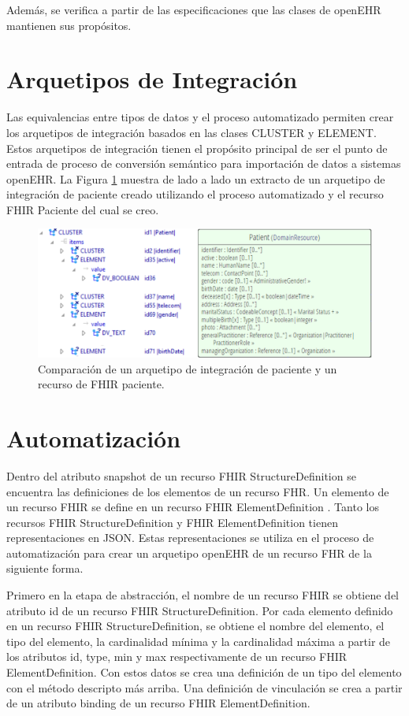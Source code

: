 Además, se verifica a partir de las especificaciones que las clases de openEHR mantienen sus propósitos.

\section{Arquetipos de Integración}

Las equivalencias entre tipos de datos y el proceso automatizado permiten crear los arquetipos de integración basados en las clases CLUSTER y ELEMENT. Estos arquetipos de integración tienen el propósito principal de ser el punto de entrada de proceso de conversión semántico para importación de datos a sistemas openEHR. La Figura \ref{fig:comparison} muestra de lado a lado un extracto de un arquetipo de integración de paciente creado utilizando el proceso automatizado y el recurso FHIR Paciente del cual se creo.

\begin{figure}
  \centering
  \includegraphics[scale=0.8]{./images/comparison_patient.png}
  \caption{Comparación de un arquetipo de integración de paciente y un recurso de FHIR paciente.}
  \label{fig:comparison}
\end{figure}

\section{Automatización}

Dentro del atributo snapshot de un recurso FHIR StructureDefinition se encuentra las definiciones de los elementos de un recurso FHR. Un elemento de un recurso FHIR se define en un recurso FHIR ElementDefinition \cite{FHIRElementDefinition}. Tanto los recursos FHIR StructureDefinition y FHIR ElementDefinition tienen representaciones en JSON. Estas representaciones se utiliza en el proceso de automatización para crear un arquetipo openEHR de un recurso FHR de la siguiente forma.

Primero en la etapa de abstracción, el nombre de un recurso FHIR se obtiene del atributo id de un recurso FHIR StructureDefinition. Por cada elemento definido en un recurso FHIR StructureDefinition, se obtiene el nombre del elemento, el tipo del elemento, la cardinalidad mínima y la cardinalidad máxima a partir de los atributos id, type, min y max respectivamente de un recurso FHIR ElementDefinition. Con estos datos se crea una definición de un tipo del elemento con el método descripto más arriba. Una definición de vinculación se crea a partir de un atributo binding de un recurso FHIR ElementDefinition.

